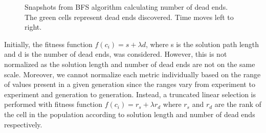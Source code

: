 \begin{figure}[!h]
\centering
            \hfill
            \hfill
            \hfill
            \hfill
            \caption{Snapshots from BFS algorithm calculating number of dead ends. The green cells represent dead ends discovered. Time moves left to right.}
\label{fig:dead-ends}
\end{figure}

Initially, the fitness function $f(c_i) = s + \lambda d$, where s is the solution path length and d is the number of dead ends, was considered. However, this is not normalized as the solution length and number of dead ends are not on the same scale. Moreover, we cannot normalize each metric individually based on the range of values present in a given generation since the ranges vary from experiment to experiment and generation to generation. Instead, a truncated linear selection is performed with fitness function $f(c_i) = r_s + \lambda r_d$ where $r_s$ and $r_d$ are the rank of the cell in the population according to solution length and number of dead ends respectively.